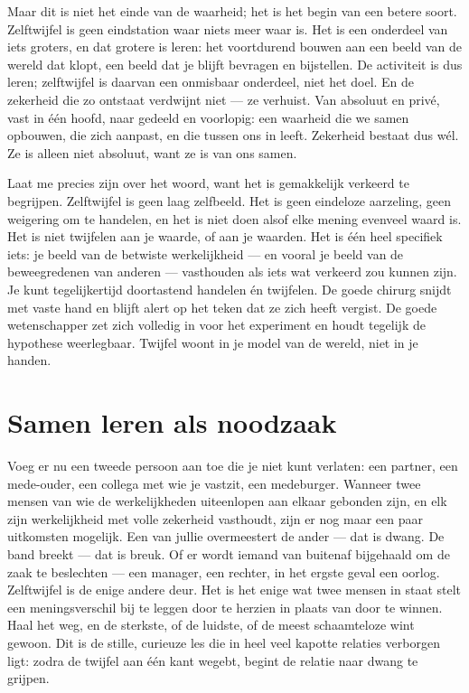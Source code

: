 \documentclass{article}
\begin{document}
Maar dit is niet het einde van de waarheid; het is het begin van een betere soort. Zelftwijfel is geen eindstation waar niets meer waar is. Het is een onderdeel van iets groters, en dat grotere is leren: het voortdurend bouwen aan een beeld van de wereld dat klopt, een beeld dat je blijft bevragen en bijstellen. De activiteit is dus leren; zelftwijfel is daarvan een onmisbaar onderdeel, niet het doel. En de zekerheid die zo ontstaat verdwijnt niet --- ze verhuist. Van absoluut en privé, vast in één hoofd, naar gedeeld en voorlopig: een waarheid die we samen opbouwen, die zich aanpast, en die tussen ons in leeft. Zekerheid bestaat dus wél. Ze is alleen niet absoluut, want ze is van ons samen.

Laat me precies zijn over het woord, want het is gemakkelijk verkeerd te begrijpen. Zelftwijfel is geen laag zelfbeeld. Het is geen eindeloze aarzeling, geen weigering om te handelen, en het is niet doen alsof elke mening evenveel waard is. Het is niet twijfelen aan je waarde, of aan je waarden. Het is één heel specifiek iets: je beeld van de betwiste werkelijkheid --- en vooral je beeld van de beweegredenen van anderen --- vasthouden als iets wat verkeerd zou kunnen zijn. Je kunt tegelijkertijd doortastend handelen én twijfelen. De goede chirurg snijdt met vaste hand en blijft alert op het teken dat ze zich heeft vergist. De goede wetenschapper zet zich volledig in voor het experiment en houdt tegelijk de hypothese weerlegbaar. Twijfel woont in je model van de wereld, niet in je handen.

\section*{Samen leren als noodzaak}

Voeg er nu een tweede persoon aan toe die je niet kunt verlaten: een partner, een mede-ouder, een collega met wie je vastzit, een medeburger. Wanneer twee mensen van wie de werkelijkheden uiteenlopen aan elkaar gebonden zijn, en elk zijn werkelijkheid met volle zekerheid vasthoudt, zijn er nog maar een paar uitkomsten mogelijk. Een van jullie overmeestert de ander --- dat is dwang. De band breekt --- dat is breuk. Of er wordt iemand van buitenaf bijgehaald om de zaak te beslechten --- een manager, een rechter, in het ergste geval een oorlog. Zelftwijfel is de enige andere deur. Het is het enige wat twee mensen in staat stelt een meningsverschil bij te leggen door te herzien in plaats van door te winnen. Haal het weg, en de sterkste, of de luidste, of de meest schaamteloze wint gewoon. Dit is de stille, curieuze les die in heel veel kapotte relaties verborgen ligt: zodra de twijfel aan één kant wegebt, begint de relatie naar dwang te grijpen.
\end{document}

